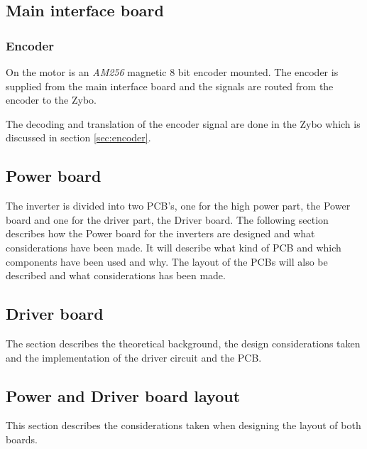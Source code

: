 \subsection{Main interface board}

\subsubsection{Encoder}

On the motor is an \textit{AM256} magnetic 8 bit encoder mounted. The encoder is supplied from the main interface board and the signals are routed from the encoder to the Zybo. 

The decoding and translation of the encoder signal are done in the Zybo which is discussed in section \ref{sec:encoder}.





\subsection{Power board}
The inverter is divided into two PCB's, one for the high power part, the Power board and one for the driver part, the Driver board. The following section describes how the Power board for the inverters are designed and what considerations have been made. It will describe what kind of PCB and which components have been used and why. The layout of the PCBs will also be described and what considerations has been made. \\

% 
% 

\subsection{Driver board}
The section describes the theoretical background, the design considerations taken and the implementation of the driver circuit and the PCB.



\subsection{Power and Driver board layout}
This section describes the considerations taken when designing the layout of both boards.
